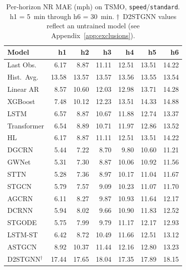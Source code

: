 \documentclass[a4paper]{cas-sc}
\begin{document}
\begin{table}[h]
\centering
\caption{Per-horizon NR MAE (mph) on TSMO,
         \texttt{speed}/\texttt{standard}.
         h1 = 5~min through h6 = 30~min.
         $\dagger$~D2STGNN values reflect an untrained model
         (see Appendix~\ref{app:exclusions}).}
\label{tab:per_horizon_tsmo}
\small
\begin{tabular}{lrrrrrr}
\toprule
Model & h1 & h2 & h3 & h4 & h5 & h6 \\
\midrule
Last Obs.          &  6.17 &  8.87 & 11.11 & 12.51 & 13.51 & 14.22 \\
Hist.\ Avg.        & 13.58 & 13.57 & 13.57 & 13.56 & 13.55 & 13.54 \\
Linear AR          &  8.57 & 10.60 & 12.03 & 12.98 & 13.71 & 14.28 \\
XGBoost            &  7.48 & 10.12 & 12.23 & 13.51 & 14.33 & 14.88 \\
\midrule
LSTM               &  6.57 &  8.87 & 10.67 & 11.88 & 12.74 & 13.37 \\
Transformer        &  6.54 &  8.89 & 10.71 & 11.97 & 12.86 & 13.52 \\
\midrule
HL                 &  6.17 &  8.87 & 11.11 & 12.51 & 13.51 & 14.22 \\
DGCRN              &  5.44 &  7.22 &  8.70 &  9.80 & 10.60 & 11.21 \\
GWNet              &  5.31 &  7.30 &  8.87 & 10.06 & 10.92 & 11.56 \\
STTN               &  5.28 &  7.36 &  8.97 & 10.17 & 11.04 & 11.67 \\
STGCN              &  5.79 &  7.57 &  9.09 & 10.23 & 11.07 & 11.70 \\
AGCRN              &  6.11 &  8.27 &  9.87 & 10.93 & 11.64 & 12.17 \\
DCRNN              &  5.94 &  8.02 &  9.66 & 10.90 & 11.83 & 12.52 \\

STGODE             &  5.75 &  7.99 &  9.79 & 11.17 & 12.17 & 12.93 \\
LSTM-ST            &  6.42 &  8.72 & 10.49 & 11.66 & 12.51 & 13.12 \\
ASTGCN             &  8.92 & 10.37 & 11.44 & 12.16 & 12.80 & 13.23 \\
D2STGNN$^\dagger$  & 17.44 & 17.65 & 18.04 & 17.35 & 17.89 & 18.15 \\
\bottomrule
\end{tabular}
\end{table}
\end{document}
